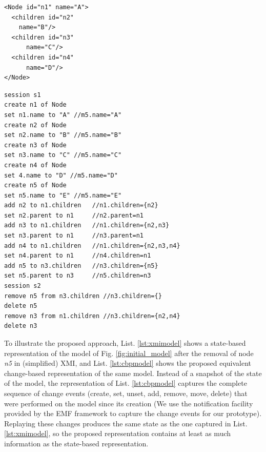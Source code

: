 \documentclass{llncs}
\begin{document}
\noindent
\begin{minipage}[t]{0.34\linewidth}
\begin{lstlisting}[style=xmi,caption={State-based representation of the model of Figure \ref{fig:initial_model} after removal of node \emph{n5} in (simplified) XMI.},label=lst:xmimodel]
<Node id="n1" name="A">
  <children id="n2" 
    name="B"/>
  <children id="n3"
      name="C"/>
  <children id="n4"
      name="D"/>
</Node>
\end{lstlisting}
\end{minipage}
\hfill
\begin{minipage}[t]{0.635\linewidth}
\begin{lstlisting}[style=eol,caption={Change-based representation of the model of Figure \ref{fig:initial_model} after removal of node \emph{n5}.},label=lst:cbpmodel]
session s1
create n1 of Node
set n1.name to "A" //m5.name="A"
create n2 of Node
set n2.name to "B" //m5.name="B"
create n3 of Node
set n3.name to "C" //m5.name="C"
create n4 of Node
set 4.name to "D" //m5.name="D"
create n5 of Node
set n5.name to "E" //m5.name="E"
add n2 to n1.children   //n1.children={n2}
set n2.parent to n1     //n2.parent=n1
add n3 to n1.children   //n1.children={n2,n3}
set n3.parent to n1     //n3.parent=n1
add n4 to n1.children   //n1.children={n2,n3,n4}
set n4.parent to n1     //n4.children=n1
add n5 to n3.children   //n3.children={n5}
set n5.parent to n3     //n5.children=n3
session s2
remove n5 from n3.children //n3.children={}
delete n5 
remove n3 from n1.children //n3.children={n2,n4}
delete n3
\end{lstlisting}
\end{minipage}

To illustrate the proposed approach, List. \ref{lst:xmimodel} shows a state-based representation of the model of Fig. \ref{fig:initial_model} after the removal of node \emph{n5} in (simplified) XMI, and List. \ref{lst:cbpmodel} shows the proposed equivalent change-based representation of the same model. Instead of a snapshot of the state of the model, the representation of List. \ref{lst:cbpmodel} captures the complete sequence of change events (create, set, unset, add, remove, move, delete) that were performed on the model since its creation (We use the notification facility provided by the EMF framework to capture the change events for our prototype). Replaying these changes produces the same state as the one captured in List. \ref{lst:xmimodel}, so the proposed representation contains at least as much information as the state-based representation. 
\end{document}
